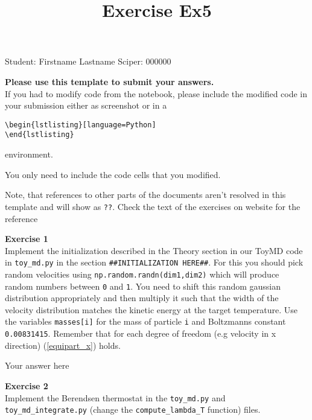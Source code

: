 \documentclass{article}
\title{Exercise Ex5}
\begin{document}
\maketitle\maketitle

Student:  Firstname Lastname    Sciper: 000000

\begin{mdframed}
\textbf{Please use this template to submit your answers.}\\
If you had to modify code from the notebook, please include the modified code in your submission either as screenshot or in a

\begin{verbatim}
\begin{lstlisting}[language=Python]
\end{lstlisting}
\end{verbatim}

environment.

You only need to include the code cells that you modified.

Note, that references to other parts of the documents aren't resolved in this template and will show as \texttt{??}. Check the text of the exercises on website for the reference
\end{mdframed}

\begin{mdframed}
\textbf{Exercise 1}\\
Implement the initialization described in the Theory section in our ToyMD code in \texttt{toy\_md.py} in the section \texttt{\#\#INITIALIZATION HERE\#\#}. For this you should pick random velocities using \texttt{np.random.randn(dim1,dim2)} which will produce random numbers between \texttt{0} and \texttt{1}. You need to shift this random gaussian distribution appropriately and then multiply it such that the width of the velocity distribution matches the kinetic energy at the target temperature. Use the variables \texttt{masses[i]} for the mass of particle \texttt{i} and Boltzmanns constant \texttt{0.00831415}. Remember that for each degree of freedom (e.g velocity in x direction) (\ref{equipart_x}) holds.
\end{mdframed}

Your answer here

\begin{mdframed}
\textbf{Exercise 2}\\
Implement the Berendsen thermostat in the \texttt{toy\_md.py} and \texttt{toy\_md\_integrate.py} (change the \texttt{compute\_lambda\_T} function) files.
\end{mdframed}
\end{document}
